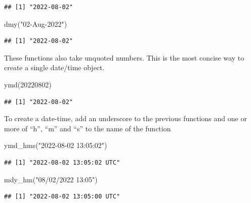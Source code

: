 \documentclass[
]{book}
\newenvironment{Shaded}{\begin{snugshade}}{\end{snugshade}}
\newcommand{\DecValTok}[1]{\textcolor[rgb]{0.00,0.00,0.81}{#1}}
\newcommand{\FunctionTok}[1]{\textcolor[rgb]{0.00,0.00,0.00}{#1}}
\newcommand{\NormalTok}[1]{#1}
\newcommand{\StringTok}[1]{\textcolor[rgb]{0.31,0.60,0.02}{#1}}
\begin{document}
\begin{verbatim}
## [1] "2022-08-02"
\end{verbatim}

\begin{Shaded}
\begin{Highlighting}[]
\FunctionTok{dmy}\NormalTok{(}\StringTok{"02{-}Aug{-}2022"}\NormalTok{)}
\end{Highlighting}
\end{Shaded}

\begin{verbatim}
## [1] "2022-08-02"
\end{verbatim}

These functions also take unquoted numbers. This is the most concise way to create a single date/time object.

\begin{Shaded}
\begin{Highlighting}[]
\FunctionTok{ymd}\NormalTok{(}\DecValTok{20220802}\NormalTok{)}
\end{Highlighting}
\end{Shaded}

\begin{verbatim}
## [1] "2022-08-02"
\end{verbatim}

To create a date-time, add an underscore to the previous functions and one or more of ``h'', ``m'' and ``s'' to the name of the function

\begin{Shaded}
\begin{Highlighting}[]
\FunctionTok{ymd\_hms}\NormalTok{(}\StringTok{"2022{-}08{-}02 13:05:02"}\NormalTok{)}
\end{Highlighting}
\end{Shaded}

\begin{verbatim}
## [1] "2022-08-02 13:05:02 UTC"
\end{verbatim}

\begin{Shaded}
\begin{Highlighting}[]
\FunctionTok{mdy\_hm}\NormalTok{(}\StringTok{"08/02/2022 13:05"}\NormalTok{)}
\end{Highlighting}
\end{Shaded}

\begin{verbatim}
## [1] "2022-08-02 13:05:00 UTC"
\end{verbatim}
\end{document}
